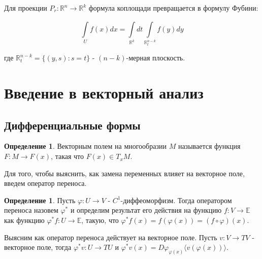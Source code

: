 \documentclass[a5paper]{article}
\newcounter{through}
\theoremstyle{plain}
\newtheorem{corollary}[through]{Следствие}
\theoremstyle{definition}
\newtheorem{definition}[through]{Определение}
\numberwithin{through}{section}
\numberwithin{equation}{section}
\begin{document}
%	
	

Для проекции $P_r : \mathbb{R}^n \to \mathbb{R}^k$ формула коплощади превращается в формулу Фубини:

\begin{equation*}
		\int\limits_{U}^{} f(x) dx = \int\limits_{\mathbb{R}^k}^{}dt \int\limits_{\mathbb{R}_t^{n-k}} f(y) dy
\end{equation*}

где $\mathbb{R}_t^{n-k} = \{(y, s) : s=t\}$ - $(n-k)$-мерная плоскость.


\section{Введение в векторный анализ}
\subsection{Дифференциальные формы}

\begin{definition}	Векторным полем на многообразии $M$ называется функция
	 $F : M \to F(x)$, такая что $F(x) \in T_{x}M$.
\end{definition}

Для того, чтобы выяснить, как замена переменных влияет на векторное поле, введем оператор переноса.

\begin{definition}
	Пусть $\varphi : U \to V$ - $C^1$-диффеоморфизм. Тогда оператором переноса  назовем $\varphi^{*}$ и определим результат его действия на функцию $f : V \to \mathbb{E}$ как функцию $\varphi^{*}f : U \to \mathbb{E}$, такую, что $\varphi^{*}f(x)=f(\varphi(x))=(f \circ \varphi)(x)$.
\end{definition}

Выясним как оператор переноса действует на векторное поле. Пусть $v : V \to TV$ - векторное поле, тогда $\varphi^{*}v : U \to TU$ и $\varphi^{*}v(x)=D\varphi_{\varphi(x)} \langle v(\varphi(x)) \rangle$.
\end{document}
